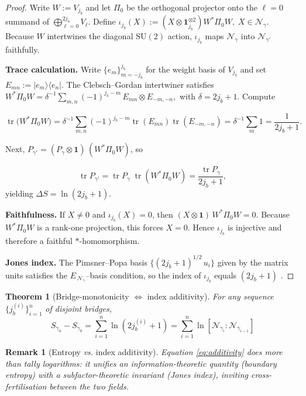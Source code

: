 \documentclass[11pt]{article}
\newtheorem{theorem}{Theorem}[section]
\newtheorem{remark}{Remark}[section]
\begin{document}
\begin{proof}
Write $W:=V_{j_b}$ and let $\Pi_0$ be the orthogonal projector onto the
$\ell=0$ summand of $\bigoplus_{\ell=0}^{2j_b}V_{\ell}$.  Define
\(
  \iota_{j_b}(X):=
  (X\otimes\mathbf 1_{j_b}^{\otimes2})W^{*}\Pi_0 W,
  \;X\in\mathcal N_{\gamma}.
\)
Because $W$ intertwines the diagonal $\mathrm{SU}(2)$ action,
$\iota_{j_b}$ maps $\mathcal N_{\gamma}$ into
$\mathcal N_{\gamma'}$ faithfully.

\medskip
\noindent\textbf{Trace calculation.}
Write $\{e_m\}_{m=-j_b}^{j_b}$ for the weight basis of $V_{j_b}$ and set
$E_{mn}:=|e_m\rangle\langle e_n|$.
The Clebsch–Gordan intertwiner satisfies
\(
  W^{*}\Pi_0 W
  =\delta^{-1}\!\sum_{m,n}(-1)^{j_b-m}\,E_{mn}\otimes E_{-m,-n},
\)
with $\delta=2j_b+1$.
Compute

\[
  \operatorname{tr}\bigl(W^{*}\Pi_0 W\bigr)
  =\delta^{-1}\sum_{m,n}(-1)^{j_b-m}
       \operatorname{tr}(E_{mn})\operatorname{tr}(E_{-m,-n})
  =\delta^{-1}\sum_{m}1
  =\frac{1}{2j_b+1}.
\]

Next, $P_{\gamma'}=(P_{\gamma}\otimes\mathbf1)\,(W^{*}\Pi_0 W)$, so

\[
  \operatorname{tr}P_{\gamma'}
  =\operatorname{tr}P_{\gamma}\;\operatorname{tr}(W^{*}\Pi_0 W)
  =\frac{\operatorname{tr}P_{\gamma}}{2j_b+1},
\]
yielding $\Delta S=\ln(2j_b+1)$.

\noindent\textbf{Faithfulness.}
If $X\ne0$ and $\iota_{j_b}(X)=0$, 
then $(X\otimes\mathbf1)\,W^{*}\Pi_0 W=0$.
Because $W^{*}\Pi_0 W$ is a rank-one projection, this forces
$X=0$.  Hence $\iota_{j_b}$ is injective and therefore a faithful
\(*\)-homomorphism.

\medskip
\noindent\textbf{Jones index.}  
The Pimsner–Popa basis $\{(2j_b+1)^{1/2}\,u_i\}$ given by the matrix units
satisfies the \(E_{\,\mathcal N_\gamma}\)–basis condition, so the index of
$\iota_{j_b}$ equals $(2j_b+1)$ \cite[Thm.~2.1]{PopaCBMS}.
\end{proof}

\begin{theorem}[Bridge-monotonicity $\Leftrightarrow$ index additivity]
For any sequence $\{j_b^{(i)}\}_{i=1}^{n}$ of disjoint bridges,
\[
  S_{\gamma_n}-S_{\gamma_0}
  =\sum_{i=1}^{n}\ln\!(2j_b^{(i)}+1)
  =\sum_{i=1}^{n}\ln[\mathcal N_{\gamma_i}:\mathcal N_{\gamma_{i-1}}]
  \tag{\thetheorem}\label{eq:additivity}
\]
\end{theorem}

\begin{remark}[Entropy \emph{vs.} index additivity]\label{rem:additivity}
Equation \eqref{eq:additivity} does more than tally logarithms:
it unifies an \emph{information-theoretic} quantity 
(boundary entropy) with a \emph{subfactor-theoretic} invariant 
(Jones index), inviting cross-fertilisation between the two fields.
\end{remark}
\end{document}
